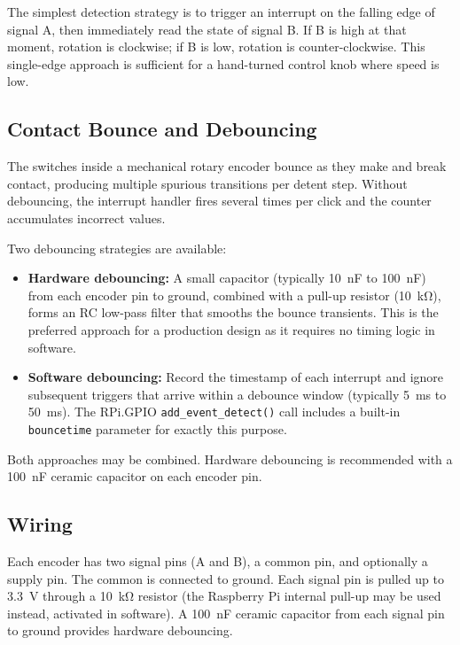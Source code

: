 The simplest detection strategy is to trigger an interrupt on the falling edge of
signal A, then immediately read the state of signal B. If B is high at that moment,
rotation is clockwise; if B is low, rotation is counter-clockwise. This single-edge
approach is sufficient for a hand-turned control knob where speed is low.

\subsection{Contact Bounce and Debouncing}

The switches inside a mechanical rotary encoder bounce as they make and break contact,
producing multiple spurious transitions per detent step. Without debouncing, the
interrupt handler fires several times per click and the counter accumulates incorrect
values.

Two debouncing strategies are available:

\begin{itemize}
    \item \textbf{Hardware debouncing:} A small capacitor (typically \SI{10}{\nano\farad}
    to \SI{100}{\nano\farad}) from each encoder pin to ground, combined with a pull-up
    resistor (\SI{10}{\kilo\ohm}), forms an RC low-pass filter that smooths the bounce
    transients. This is the preferred approach for a production design as it requires no
    timing logic in software.

    \item \textbf{Software debouncing:} Record the timestamp of each interrupt and
    ignore subsequent triggers that arrive within a debounce window (typically
    \SI{5}{\milli\second} to \SI{50}{\milli\second}). The RPi.GPIO
    \texttt{add\_event\_detect()} call includes a built-in \texttt{bouncetime}
    parameter for exactly this purpose.
\end{itemize}

Both approaches may be combined. Hardware debouncing is recommended with a
\SI{100}{\nano\farad} ceramic capacitor on each encoder pin.

\subsection{Wiring}

Each encoder has two signal pins (A and B), a common pin, and optionally a supply
pin. The common is connected to ground. Each signal pin is pulled up to \SI{3.3}{\volt}
through a \SI{10}{\kilo\ohm} resistor (the Raspberry Pi internal pull-up may be used
instead, activated in software). A \SI{100}{\nano\farad} ceramic capacitor from each
signal pin to ground provides hardware debouncing.

